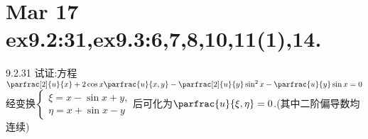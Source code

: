 



\section{Mar 17 ex9.2:31,ex9.3:6,7,8,10,11(1),14.}

\begin{exercise}{9.2.31}
试证:方程$\parfrac[2]{u}{x} + 2 \cos x \parfrac{u}{x,y} - \parfrac[2]{u}{y} \sin^2 x - \parfrac{u}{y} \sin x = 0$经变换$\begin{cases}
    \xi = x - \sin x + y,\\
    \eta = x + \sin x - y
\end{cases}$后可化为$\parfrac{u}{\xi,\eta} = 0$.(其中二阶偏导数均连续)
\end{exercise}

